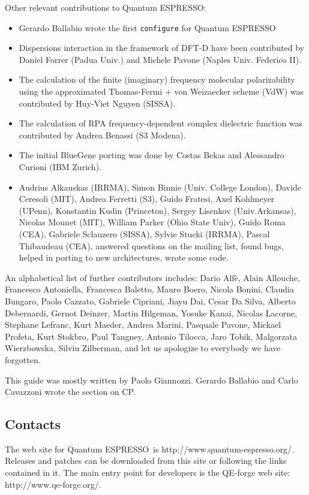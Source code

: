 \documentclass[12pt,a4paper]{article}
\def\qe{{\sc Quantum ESPRESSO}}
\begin{document}
Other relevant contributions to \qe:
\begin{itemize}
  \item Gerardo Ballabio wrote the first \texttt{configure} for \qe
  \item Dispersions interaction in the framework of DFT-D have been
contributed by Daniel Forrer (Padua Univ.) and Michele Pavone
(Naples Univ. Federico II).
  \item The calculation of the finite (imaginary) frequency molecular
polarizability using the approximated Thomas-Fermi  + von
Weizaecker scheme (VdW) was contributed by Huy-Viet Nguyen
(SISSA).
  \item The calculation of RPA frequency-dependent complex dielectric
function was contributed by Andrea Benassi (S3 Modena).
  \item The initial BlueGene porting was done by Costas Bekas and
  Alessandro Curioni (IBM Zurich).
  \item Audrius Alkauskas (IRRMA), 
Simon Binnie (Univ. College London), Davide Ceresoli (MIT),
Andrea Ferretti (S3), Guido Fratesi, Axel Kohlmeyer (UPenn),
Konstantin Kudin (Princeton), Sergey Lisenkov (Univ.Arkansas), 
Nicolas Mounet (MIT), William Parker (Ohio State Univ), 
Guido Roma (CEA), Gabriele Sclauzero (SISSA), Sylvie Stucki (IRRMA), Pascal Thibaudeau (CEA), 
answered questions on the mailing list, found bugs, helped in 
porting to new architectures, wrote some code.
\end{itemize}

An alphabetical list of further contributors includes: Dario Alf\`e, 
Alain Allouche, Francesco Antoniella, Francesca Baletto,
Mauro Boero, Nicola Bonini, Claudia Bungaro, 
Paolo Cazzato, Gabriele Cipriani, Jiayu Dai, Cesar Da Silva, 
Alberto Debernardi, Gernot Deinzer, 
Martin Hilgeman,  Yosuke Kanai, Nicolas Lacorne, Stephane Lefranc,
Kurt Maeder, Andrea Marini, 
Pasquale Pavone,  Mickael Profeta, Kurt Stokbro, 
Paul Tangney, 
Antonio Tilocca, Jaro Tobik, 
Malgorzata Wierzbowska, Silviu Zilberman, 
and let us apologize to everybody we have forgotten.
    
This guide was mostly written by Paolo Giannozzi.
Gerardo Ballabio and Carlo Cavazzoni wrote the section on CP.

\subsection{Contacts}

The web site for \qe\ is http://www.quantum-espresso.org/.
Releases and patches can be downloaded from this
site or following the links contained in it. The main entry point for 
developers is the QE-forge web site: http://www.qe-forge.org/.
\end{document}
